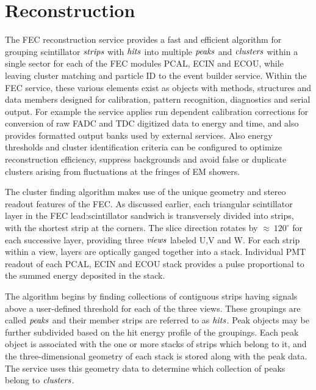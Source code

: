 \section{Reconstruction}

The FEC reconstruction service provides a fast and efficient algorithm for grouping scintillator $\it{strips}$ with $\it{hits}$ into multiple $\it{peaks}$ and $\it{clusters}$ within a single sector for each of the FEC modules PCAL, ECIN and ECOU, while leaving cluster matching and particle ID to the event builder service.  Within the FEC service, these various elements exist as objects with methods, structures and data members designed for calibration, pattern recognition, diagnostics and serial output.  For example the service applies run dependent calibration corrections for conversion of raw FADC and TDC digitized data to energy and time, and also provides formatted output banks used by external services.  Also energy thresholds and cluster identification criteria can be configured to optimize reconstruction efficiency, suppress backgrounds and avoid false or duplicate clusters arising from fluctuations at the fringes of EM showers. 

The cluster finding algorithm makes use of the unique geometry and stereo readout features of the FEC. As discussed earlier, each triangular scintillator layer in the FEC lead:scintillator sandwich is transversely divided into strips, with the shortest strip at the corners. The slice direction rotates by $\approx~120^{\circ}$ for each successive layer, providing three $\it{views}$ labeled U,V and W.  For each strip within a view, layers are optically ganged together into a stack.  Individual PMT readout of each PCAL, ECIN and ECOU stack provides a pulse proportional to the summed energy deposited in the stack.

The algorithm begins by finding collections of contiguous strips having signals above a user-defined threshold for each of the three views. These groupings are called $\it{peaks}$ and their member strips are referred to as $\it{hits}$.  Peak objects may be further subdivided based on the hit energy profile of the groupings.  Each peak object is associated with the one or more stacks of strips which belong to it, and the three-dimensional geometry of each stack is stored along with the peak data.  The service uses this geometry data to determine which collection of peaks belong to $\it{clusters}$. 


